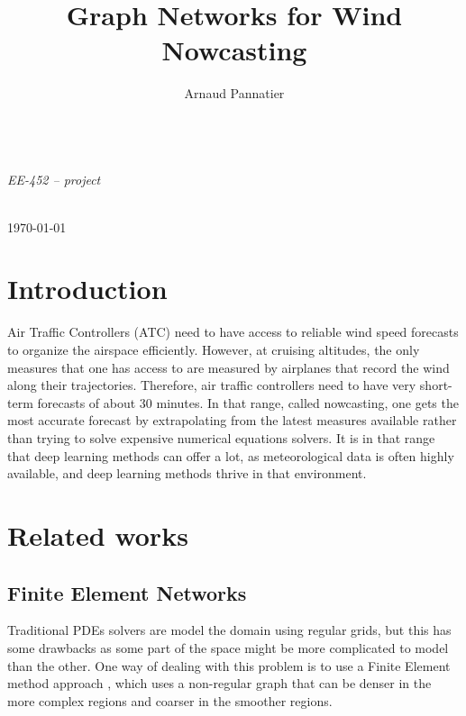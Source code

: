 \documentclass[a4paper,10pt]{article}
\title{Graph Networks for Wind Nowcasting}
\author{Arnaud Pannatier}
\newcommand{\ap}[1]{\marginpar{{\tiny \color{purple} [AP] #1}}}
\begin{document}
\centering
\vspace*{0cm}
{\fontsize{35}{60}\selectfont \bfseries \thetitle } \\
\vspace{1cm}
\Large \textit{EE-452 -- project} \\
\vspace{0.5cm}
\normalfont
\Large \theauthor \\
\vspace{0.5cm}

\small\today

\normalfont\normalsize

\justifying

\section{Introduction}

Air Traffic Controllers (ATC) need to have access to reliable wind speed forecasts to organize the airspace efficiently. However, at cruising altitudes, the only measures that one has access to are measured by airplanes that record the wind along their trajectories. Therefore, air traffic controllers need to have very short-term forecasts of about 30 minutes. In that range, called nowcasting, one gets the most accurate forecast by extrapolating from the latest measures available rather than trying to solve expensive numerical equations solvers. It is in that range that deep learning methods can offer a lot, as meteorological data is often highly available, and deep learning methods thrive in that environment.

\section{Related works}

\subsection{Finite Element Networks}

Traditional PDEs solvers are model the domain using regular grids, but this has some drawbacks as some part of the space might be more complicated to model than the other. One way of dealing with this problem is to use a Finite Element method approach \cite{hughes2012finite}, which uses a non-regular graph that can be denser in the more complex regions and coarser in the smoother regions.

\ap{advantages / drawbacks}
\end{document}
